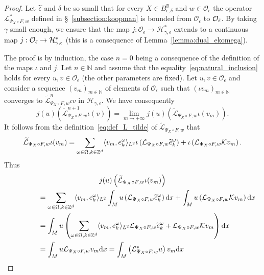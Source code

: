 \documentclass[10pt]{amsart}
\theoremstyle{definition}\newtheorem{defi}[theo]{Definition}\newtheorem{rema}[theo]{Remark}\newtheorem{exam}[theo]{Example}\newtheorem{exem}[theo]{Example}\newtheorem{nota}[theo]{Notation}
\newcommand{\p}[1]{\left(#1\right)}
\newcommand{\brac}[1]{\langle #1 \rangle}
\newcommand{\clO}{\mathcal{O}}
\newcommand{\clL}{\mathcal{L}}
\newcommand{\clH}{\mathcal{H}}
\newcommand{\clK}{\mathcal{K}}
\newcommand{\bbZ}{\mathbb{Z}}
\newcommand{\bbN}{\mathbb{N}}
\newcommand{\bbR}{\mathbb{R}}
\newcommand{\rmd}{\mathrm{d}}
\let\oldtilde\tilde
\renewcommand*{\tilde}[1]{\mathchoice{\widetilde{#1}}{\widetilde{#1}}{\oldtilde{#1}}{\oldtilde{#1}}}
\begin{document}
\begin{proof}
Let $\tilde{\epsilon}$ and $\delta$ be so small that for every $X \in B_{\epsilon,\delta}^{\bbR}$ and $w \in \clO_\epsilon$ the operator $\clL_{\Psi_X \circ F,w}^*$ defined in \S~\ref{subsection:koopman} is bounded from $\clO_\epsilon$ to $\clO_{\tilde{\epsilon}}$. By taking $\gamma$ small enough, we ensure that the map $j : \clO_\epsilon \to \clH_{\gamma,\epsilon}^*$ extends to a continuous map $j : \clO_{\tilde{\epsilon}} \to \clH_{\gamma,\epsilon}^*$ (this is a consequence of Lemma~\ref{lemma:dual_ekomega}).

The proof is by induction, the case $n = 0$ being a consequence of the definition of the maps $\iota$ and $j$. Let $n \in \bbN$ and assume that the equality~\eqref{eq:natural_inclusion} holds for every $u,v \in \clO_\epsilon$ (the other parameters are fixed). Let $u,v \in \clO_\epsilon$ and consider a sequence $(v_m)_{m \in \bbN}$ of elements of $\clO_\epsilon$ such that $(\iota v_m)_{m \in \bbN}$ converges to $\widetilde{\clL}_{\Psi_X \circ F,w}^n \iota v$ in $\clH_{\gamma,\epsilon}$. We have consequently
\begin{equation*}
j(u)\p{\widetilde{\clL}_{\Psi_X \circ F,w}^{n+1} \iota(v)} = \lim_{m \to + \infty} j(u)\p{\widetilde{\clL}_{\Psi_X \circ F,w} \iota(v_m)}.
\end{equation*}
It follows from the definition~\eqref{eq:def_L_tilde} of $\widetilde{\clL}_{\Psi_X \circ F,w}$ that
\begin{equation*}
\widetilde{\clL}_{\Psi_X \circ F,w} \iota(v_m) = \sum_{\omega \in \Omega, k  \in \bbZ^d} \brac{v_m,e_k^\omega}_{L^2} \iota\p{ \clL_{\Psi_X \circ F,w} \tilde{e}_{k}^\omega} + \iota\p{\clL_{\Psi_X \circ F,w} \clK v_m}.
\end{equation*}
Thus
\begin{multline*}
 j(u)\p{\widetilde{\clL}_{\Psi_X \circ F,w} \iota(v_m)} \\
 \begin{aligned}
& \qquad \qquad = \sum_{\omega \in \Omega, k \in \bbZ^d} \brac{v_m,e_k^\omega}_{L^2} \int_M u\p{ \clL_{\Psi_X \circ F,w} \tilde{e}_{k}^\omega} \rmd x + \int_M u \p{\clL_{\Psi_X \circ F,w} \clK v_m} \rmd x \\
& \qquad \qquad = \int_M u \p{\sum_{\omega \in \Omega, k \in \bbZ^d} \brac{v_m,e_k^\omega}_{L^2} \clL_{\Psi_X \circ F,w} \tilde{e}_{k}^\omega + \clL_{\Psi_X \circ F,w} \clK v_m} \rmd x \\
& \qquad \qquad = \int_M u \clL_{\Psi_X \circ F,w} v_m \rmd x = \int_M \left(\clL_{\Psi_X \circ F,w}^* u\right)v_m \rmd x \\

\end{aligned}
\end{multline*}
\end{proof}
\end{document}
